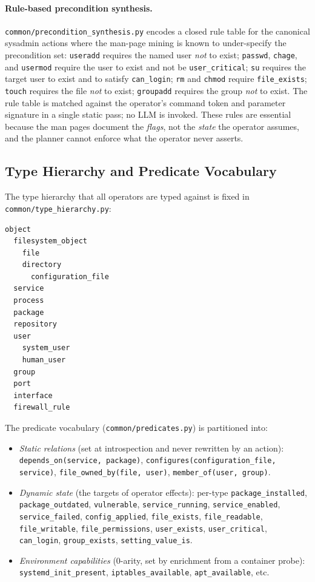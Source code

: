 \paragraph{Rule-based precondition synthesis.}
\texttt{common/precondition\_synthesis.py} encodes a closed rule table for the canonical sysadmin actions where the man-page mining is known to under-specify the precondition set:
\texttt{useradd} requires the named user \emph{not} to exist;
\texttt{passwd}, \texttt{chage}, and \texttt{usermod} require the user to exist and not be \texttt{user\_critical};
\texttt{su} requires the target user to exist and to satisfy \texttt{can\_login};
\texttt{rm} and \texttt{chmod} require \texttt{file\_exists};
\texttt{touch} requires the file \emph{not} to exist;
\texttt{groupadd} requires the group \emph{not} to exist.
The rule table is matched against the operator's command token and parameter signature in a single static pass; no LLM is invoked. These rules are essential because the man pages document the \emph{flags}, not the \emph{state} the operator assumes, and the planner cannot enforce what the operator never asserts.

\subsection{Type Hierarchy and Predicate Vocabulary}
\label{app:vocab}

The type hierarchy that all operators are typed against is fixed in \texttt{common/type\_hierarchy.py}:

\begin{verbatim}
object
  filesystem_object
    file
    directory
      configuration_file
  service
  process
  package
  repository
  user
    system_user
    human_user
  group
  port
  interface
  firewall_rule
\end{verbatim}

\noindent The predicate vocabulary (\texttt{common/predicates.py}) is partitioned into:

\begin{itemize}
  \item \emph{Static relations} (set at introspection and never rewritten by an action):
    \texttt{depends\_on(service, package)}, \texttt{configures(configuration\_file, service)},
    \texttt{file\_owned\_by(file, user)}, \texttt{member\_of(user, group)}.
  \item \emph{Dynamic state} (the targets of operator effects): per-type \texttt{package\_installed}, \texttt{package\_outdated}, \texttt{vulnerable}, \texttt{service\_running}, \texttt{service\_enabled}, \texttt{service\_failed}, \texttt{config\_applied}, \texttt{file\_exists}, \texttt{file\_readable}, \texttt{file\_writable}, \texttt{file\_permissions}, \texttt{user\_exists}, \texttt{user\_critical}, \texttt{can\_login}, \texttt{group\_exists}, \texttt{setting\_value\_is}.
  \item \emph{Environment capabilities} (0-arity, set by enrichment from a container probe): \texttt{systemd\_init\_present}, \texttt{iptables\_available}, \texttt{apt\_available}, etc.
\end{itemize}

